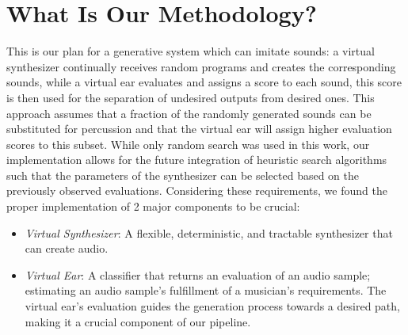 \documentclass[\main/thesis.tex]{subfiles}
\begin{document}

\section{What Is Our Methodology?}
\label{sec_methodology}
This is our plan for a generative system which can imitate sounds: a virtual synthesizer continually receives random programs and creates the corresponding sounds, while a virtual ear evaluates and assigns a score to each sound, this score is then used for the separation of undesired outputs from desired ones. This approach assumes that a fraction of the randomly generated sounds can be substituted for percussion and that the virtual ear will assign higher evaluation scores to this subset. While only random search was used in this work, our implementation allows for the future integration of heuristic search algorithms such that the parameters of the synthesizer can be selected based on the previously observed evaluations. Considering these requirements, we found the proper implementation of 2 major components to be crucial:

\begin{itemize}
    \item \textit{Virtual Synthesizer}: A flexible, deterministic, and tractable synthesizer that can create audio. 
    \item \textit{Virtual Ear}: A classifier that returns an evaluation of an audio sample; estimating an audio sample's fulfillment of a musician's requirements. The virtual ear's evaluation guides the generation process towards a desired path, making it a crucial component of our pipeline. 
\end{itemize}
\end{document}
